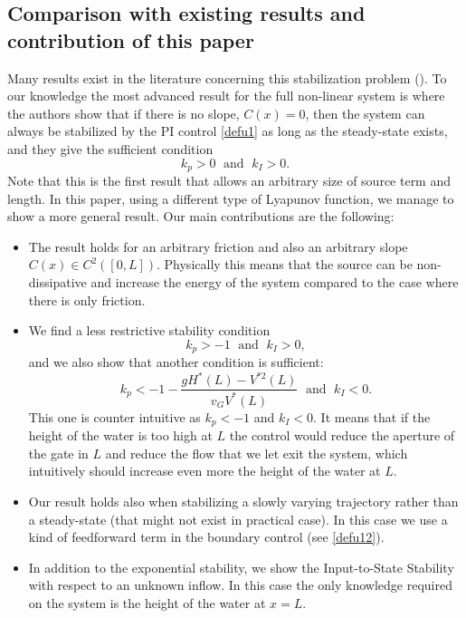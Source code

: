 \documentclass[JEP,XML,SOM,Unicode]{cedram}
\theoremstyle{definition}
\begin{document}
\subsection{Comparison with existing results and contribution of this paper}
Many results exist in the literature concerning this stabilization problem (\eg \cite{dos2008, XuSallet, BastinCoron2013, XuSallet2014, Trinh2015, BastinCoronTamasoiu2015, BastinCoronPI}). To our knowledge the most advanced result for the full non-linear system is \cite{BastinCoronPI} where the authors show that if there is no slope, \ie $C(x) = 0$, then the system can always be stabilized by the PI control \eqref{defu1} as long as the steady-state exists, and they give the sufficient condition
\begin{equation*}%
k_{p}>0\;\text{ and }\;k_{I}>0.
\end{equation*}
Note that this is the first result that allows an arbitrary size of source term and length.
In this paper, using a different type of Lyapunov function, we manage to show a more general result. Our main contributions are the following:
\begin{itemize}
\item The result holds for an arbitrary friction and also an arbitrary slope $C(x)\in C^{2}([0,L])$. Physically this means that the source can be non-dissipative and increase the energy of the system compared to the case where there is only friction.
\item We find a less restrictive stability condition
\begin{equation*}
k_{p}>-1\;\text{ and }\;k_{I}>0,
\end{equation*}
and we also show that another condition is sufficient:
\begin{equation*}
k_{p}<-1-\frac{gH^{*}(L)-V^{*2}(L)}{v_{G}V^{*}(L)}\;\text{ and }\; k_{I}<0.
\end{equation*}
This one is counter intuitive as $k_{p}<-1$ and $k_{I}<0$. {{It} means that if the height of the water is too high at $L$ the control would reduce the aperture of the gate in $L$ and reduce the flow that we let exit the system,
which intuitively should increase even more the height of the water at $L$.}
\item Our result holds also when stabilizing a slowly varying trajectory rather than a steady-state (that might not exist in practical case). In this case we use a kind of feedforward term in the boundary control {(see \eqref{defu12})}.
\item In addition to the exponential stability, we show the Input-to-State Stability with respect to an unknown inflow. In this case the only knowledge required on the system is the height of the water at $x=L$.
\end{itemize}
\end{document}
